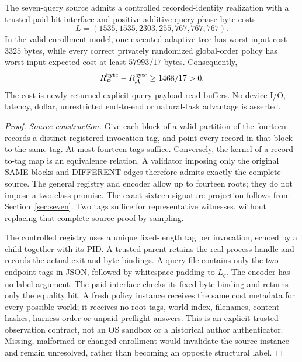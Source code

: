 \begin{proposition}
\label{prop:controlled-lineage-bytes}
The seven-query source admits a controlled recorded-identity realization with a trusted paid-bit interface and positive additive query-phase byte costs
\[
 L=(1535,1535,2303,255,767,767,767).
\]
In the valid-enrollment model, one executed adaptive tree has worst-input cost $3325$ bytes, while every correct privately randomized global-order policy has worst-input expected cost at least $57993/17$ bytes. Consequently,
\[
 R^{\rm byte}_{\mathcal P}-R^{\rm byte}_{\mathcal A}
 \geq1468/17>0.
\]
The cost is newly returned explicit query-payload read buffers. No device-I/O, latency, dollar, unrestricted end-to-end or natural-task advantage is asserted.
\end{proposition}
\begin{proof}
\emph{Source construction.} Give each block of a valid partition of the fourteen records a distinct registered invocation tag, and point every record in that block to the same tag. At most fourteen tags suffice. Conversely, the kernel of a record-to-tag map is an equivalence relation. A validator imposing only the original SAME blocks and DIFFERENT edges therefore admits exactly the complete source. The general registry and encoder allow up to fourteen roots; they do not impose a two-class promise. The exact sixteen-signature projection follows from Section~\ref{sec:seven}. Two tags suffice for representative witnesses, without replacing that complete-source proof by sampling.

The controlled registry uses a unique fixed-length tag per invocation, echoed by a child together with its PID. A trusted parent retains the real process handle and records the actual exit and byte bindings. A query file contains only the two endpoint tags in JSON, followed by whitespace padding to $L_q$. The encoder has no label argument. The paid interface checks its fixed byte binding and returns only the equality bit. A fresh policy instance receives the same cost metadata for every possible world; it receives no root tags, world index, filenames, content hashes, harness order or unpaid preflight answers. This is an explicit trusted observation contract, not an OS sandbox or a historical author authenticator. Missing, malformed or changed enrollment would invalidate the source instance and remain unresolved, rather than becoming an opposite structural label.


\end{proof}

